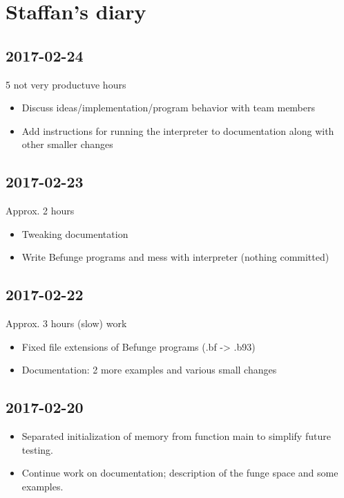 \documentclass[12pt, a4paper]{article}
\begin{document}
\section*{Staffan's diary}

\subsection*{2017-02-24}

5 not very productuve hours

\begin{itemize}
\item Discuss ideas/implementation/program behavior with team members
\item Add instructions for running the interpreter to documentation along with other smaller changes
\end{itemize}

\subsection*{2017-02-23}

Approx. 2 hours
\begin{itemize}
\item Tweaking documentation
\item Write Befunge programs and mess with interpreter (nothing committed)
\end{itemize}

\subsection*{2017-02-22}

Approx. 3 hours (slow) work
\begin{itemize}
\item Fixed file extensions of Befunge programs (.bf -> .b93)
\item Documentation: 2 more examples and various small changes
\end{itemize}

\subsection*{2017-02-20}

\begin{itemize}
\item Separated initialization of memory from function main to simplify future
  testing.
\item Continue work on documentation; description of the funge space and some
  examples.
\end{itemize}
\end{document}
